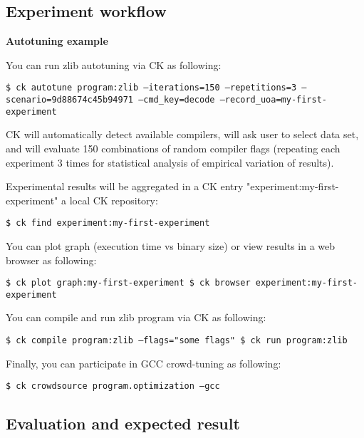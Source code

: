 \subsection{Experiment workflow}

\textbf{Autotuning example}

You can run zlib autotuning via CK as following:

\begin{flushleft}
\texttt{\$ ck autotune program:zlib --iterations=150 --repetitions=3 --scenario=9d88674c45b94971 --cmd\_key=decode --record\_uoa=my-first-experiment}
\end{flushleft}

CK will automatically detect available compilers, will ask user to select data set, 
and will evaluate 150 combinations of random compiler flags 
(repeating each experiment 3 times for statistical analysis 
of empirical variation of results).

Experimental results will be aggregated in a CK entry "experiment:my-first-experiment" a local CK repository:

\begin{flushleft}
\texttt{\$ ck find experiment:my-first-experiment}
\end{flushleft}

You can plot graph (execution time vs binary size) or view results in a web browser as following:

\begin{flushleft}
\texttt{\$ ck plot graph:my-first-experiment \newline
\$ ck browser experiment:my-first-experiment}
\end{flushleft}

You can compile and run zlib program via CK as following:
\begin{flushleft}
\texttt{\$ ck compile program:zlib --flags="some flags" \newline
\$ ck run program:zlib}
\end{flushleft}

Finally, you can participate in GCC crowd-tuning as following:
\begin{flushleft}
\texttt{\$ ck crowdsource program.optimization --gcc}
\end{flushleft}

\subsection{Evaluation and expected result}


